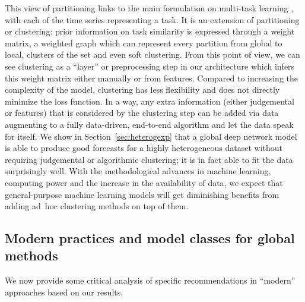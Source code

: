 \documentclass[a4paper]{article}
\theoremstyle{custom}
\begin{document}
This view of partitioning links to the main formulation on multi-task learning \cite{thung2018brief}, with each of the time series representing a task. It is an extension of partitioning or clustering: prior information on task similarity is expressed through a weight matrix, a weighted graph which can represent every partition from global to local, clusters of the set and even soft clustering.
From this point of view, we can see clustering as a ``layer'' or preprocessing step in our architecture which infers this weight matrix either manually or from features. Compared to increasing the complexity of the model, clustering has less flexibility and does not directly minimize the loss function. In a way, any extra information (either judgemental or features) that is considered by the clustering step can be added via data augmenting to a fully data-driven, end-to-end algorithm and let the data speak for itself. We show in Section~\ref{sec:heterogexp} that a global deep network model is able to produce good forecasts for a highly heterogeneous dataset without requiring judgemental or algorithmic clustering; it is in fact able to fit the data surprisingly well. With the methodological advances in machine learning, computing power and the increase in the availability of data, we expect that general-purpose machine learning models will get diminishing benefits from adding ad~hoc clustering methods on top of them.

\subsection{Modern practices and model classes for global methods}

We now provide some critical analysis of specific recommendations in ``modern'' approaches based on our results.
\end{document}
